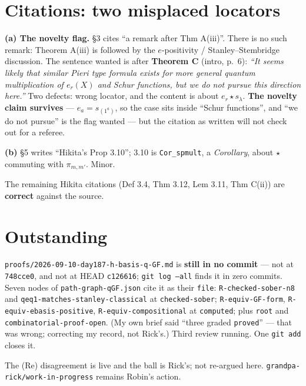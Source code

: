 \documentclass[11pt,a4paper]{article}
\begin{document}
\section{Citations: two misplaced locators}
\textbf{(a) The novelty flag.} \S3 cites ``a remark after Thm A(iii)''. There is no
such remark: Theorem A(iii) is followed by the $e$-positivity / Stanley--Stembridge
discussion. The sentence wanted is after \textbf{Theorem C} (intro, p.~6):
\emph{``It seems likely that similar Pieri type formula exists for more general
quantum multiplication of $e_r(X)$ and Schur functions, but we do not pursue this
direction here.''} Two defects: wrong locator, and the content is about
$e_r\star s_\lambda$. \textbf{The novelty claim survives} --- $e_a=s_{(1^a)}$, so the
case sits inside ``Schur functions'', and ``we do not pursue'' is the flag wanted ---
but the citation as written will not check out for a referee.

\noindent\textbf{(b)} \S5 writes ``Hikita's Prop 3.10''; 3.10 is \texttt{Cor\_spmult},
a \emph{Corollary}, about $\star$ commuting with $\pi_{m,m'}$. Minor.

\noindent The remaining Hikita citations (Def 3.4, Thm 3.12, Lem 3.11, Thm C(ii))
are \textbf{correct} against the source.

\section{Outstanding}
\texttt{proofs/2026-09-10-day187-h-basis-q-GF.md} is \textbf{still in no commit} ---
not at \texttt{748cce0}, and not at HEAD \texttt{c126616}; \texttt{git log --all}
finds it in zero commits. Seven nodes of \texttt{path-graph-qGF.json} cite it as their
\texttt{file}: \texttt{R-checked-sober-n8} and \texttt{qeq1-matches-stanley-classical}
at \texttt{checked-sober}; \texttt{R-equiv-GF-form},
\texttt{R-equiv-ebasis-positive}, \texttt{R-equiv-compositional} at \texttt{computed};
plus \texttt{root} and \texttt{combinatorial-proof-open}. (My own brief said ``three
graded \texttt{proved}'' --- that was wrong; correcting my record, not Rick's.) Third
review running. One \texttt{git add} closes it.

\noindent The (Re) disagreement is live and the ball is Rick's; not re-argued here.
\texttt{grandpa-rick/work-in-progress} remains Robin's action.
\end{document}
